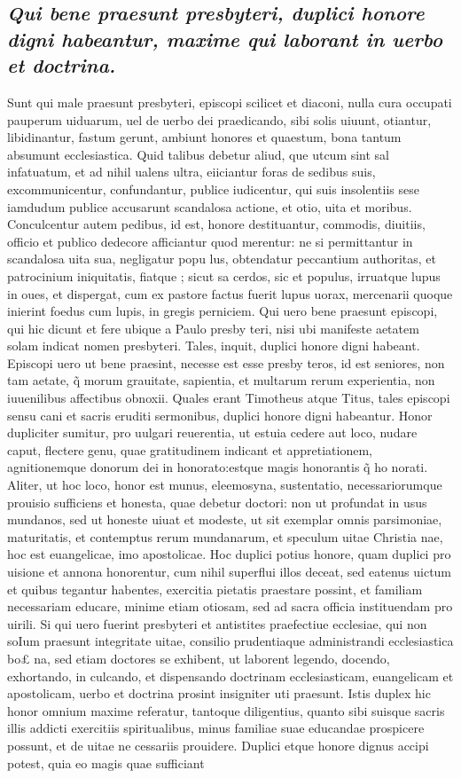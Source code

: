 \documentclass{article}
\begin{document}
\begin{pages}
\subsection*{\textit{Qui bene praesunt presbyteri, duplici honore digni habeantur, maxime qui laborant in uerbo et doctrina. }}\pstart Sunt qui male praesunt presbyteri, episcopi scilicet et diaconi, nulla cura occupati pauperum uiduarum, uel de uerbo dei praedicando, sibi solis uiuunt, otiantur, libidinantur, fastum gerunt, ambiunt honores et quaestum, bona tantum absumunt ecclesiastica. Quid talibus debetur aliud, que utcum sint sal infatuatum, et ad nihil ualens ultra, eiiciantur foras de sedibus suis, excommunicentur, confundantur, publice iudicentur, qui suis insolentiis sese iamdudum publice accusarunt scandalosa actione, et otio, uita et moribus. Conculcentur autem pedibus, id est, honore destituantur, commodis, diuitiis, officio et publico dedecore afficiantur quod merentur: ne si permittantur in scandalosa uita sua, negligatur popu lus, obtendatur peccantium authoritas, et patrocinium iniquitatis, fiatque ; sicut sa cerdos, sic et populus, irruatque lupus in oues, et dispergat, cum ex pastore factus fuerit lupus uorax, mercenarii quoque inierint foedus cum lupis, in gregis perniciem. Qui uero bene praesunt episcopi, qui hic dicunt et fere ubique a Paulo presby teri, nisi ubi manifeste aetatem solam indicat nomen presbyteri. Tales, inquit, duplici honore digni habeant. Episcopi uero ut bene praesint, necesse est esse presby teros, id est seniores, non tam aetate, q̃ morum grauitate, sapientia, et multarum rerum experientia, non iuuenilibus affectibus obnoxii. Quales erant Timotheus atque Titus, tales episcopi sensu cani et sacris eruditi sermonibus, duplici honore digni habeantur. Honor dupliciter sumitur, pro uulgari reuerentia, ut estuia cedere aut loco, nudare caput, flectere genu, quae gratitudinem indicant et appretiationem, agnitionemque donorum dei in honorato:estque magis honorantis q̃ ho norati. Aliter, ut hoc loco, honor est munus, eleemosyna, sustentatio, necessariorumque prouisio sufficiens et honesta, quae debetur doctori: non ut profundat in usus mundanos, sed ut honeste uiuat et modeste, ut sit exemplar omnis parsimoniae, maturitatis, et contemptus rerum mundanarum, et speculum uitae Christia nae, hoc est euangelicae, imo apostolicae. Hoc duplici potius honore, quam duplici pro uisione et annona honorentur, cum nihil superflui illos deceat, sed eatenus uictum et quibus tegantur habentes, exercitia pietatis praestare possint, et familiam necessariam educare, minime etiam otiosam, sed ad sacra officia instituendam pro uirili. Si qui uero fuerint presbyteri et antistites praefectiue ecclesiae, qui non soIum praesunt integritate uitae, consilio prudentiaque administrandi ecclesiastica bo£ na, sed etiam doctores se exhibent, ut laborent legendo, docendo, exhortando, in culcando, et dispensando doctrinam ecclesiasticam, euangelicam et apostolicam, uerbo et doctrina prosint insigniter uti praesunt. Istis duplex hic honor omnium maxime referatur, tantoque diligentius, quanto sibi suisque sacris illis addicti exercitiis spiritualibus, minus familiae suae educandae prospicere possunt, et de uitae ne cessariis prouidere. Duplici etque honore dignus accipi potest, quia eo magis quae sufficiant 
\end{pages}
\end{document}
